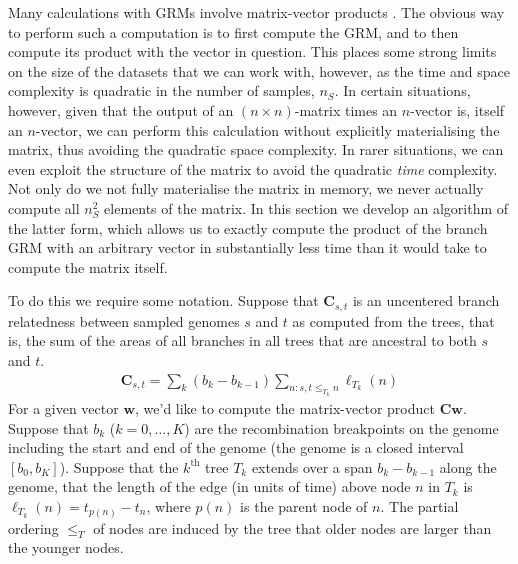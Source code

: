 Many calculations with GRMs involve matrix-vector products
\citep{colleau2002indirect, colleau2017fast}. The obvious way to perform such a
computation is to first compute the GRM, and to then compute its product with 
the vector in question. This places some strong limits on the size of the 
datasets that we can work with, however, as the time and space complexity 
is quadratic in the number of samples, $n_S$. In certain situations, however, 
given that the output of an $(n\times n)$-matrix times an $n$-vector is,
itself an $n$-vector, we can perform this calculation without explicitly
materialising the matrix, thus avoiding the quadratic space complexity.
In rarer situations, we can even exploit the structure of the matrix to 
avoid the quadratic \emph{time} complexity. Not only do we not fully
materialise the matrix in memory, we never actually compute all $n_S^2$
elements of the matrix. In this section we develop an algorithm of the 
latter form, which allows us to exactly compute the product of the 
branch GRM with an arbitrary vector in substantially less time than
it would take to compute the matrix itself.

To do this we require some notation.
Suppose that $\mathbf{C}_{s,t}$ is an uncentered branch relatedness between
sampled genomes $s$ and $t$ as computed from the trees, that is,
the sum of the areas of all branches in all trees that are ancestral to both $s$ and $t$.
\begin{align} \label{defn:pairwise_relatedness}
    \mathbf{C}_{s,t} = \sum_k (b_k - b_{k-1}) \sum_{n: s,t \le_{T_k} n} \ell_{T_k}(n) %
\end{align}
For a given vector $\mathbf{w}$, we'd like to compute the matrix-vector product $\mathbf{C}\mathbf{w}$.
Suppose that $b_k$ ($k=0,\ldots,K$) are the recombination breakpoints on the genome
including the start and end of the genome (the genome is a closed interval $[b_0, b_K]$).
Suppose that the $k^{\text{th}}$ tree $T_k$ extends over a span $b_k - b_{k-1}$ along the genome,
that the length of the edge (in units of time) above node $n$ in $T_k$ is $\ell_{T_k}(n) = t_{p(n)}-t_n$,
where $p(n)$ is the parent node of $n$.
The partial ordering $\le_T$ of nodes are induced by the tree that older nodes are larger than the younger nodes.

